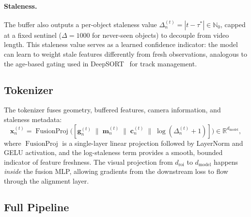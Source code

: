 \documentclass[runningheads]{llncs}
\newcommand{\mR}{\mathbb{R}}
\newcommand{\op}[1]{\operatorname{#1}}
\newcommand{\mat}[1]{\bm{#1}}
\begin{document}
\paragraph{Staleness.}  The buffer also outputs a per-object staleness value $\Delta_n^{(t)} = |t - \tau^*| \in \mathbb{N}_0$, capped at a fixed sentinel ($\Delta=1000$ for never-seen objects) to decouple from video length.  This staleness value serves as a learned confidence indicator: the model can learn to weight stale features differently from fresh observations, analogous to the age-based gating used in DeepSORT~\cite{wojke2017simple} for track management.


\subsection{Tokenizer}

The tokenizer fuses geometry, buffered features, camera information, and staleness metadata:
\begin{equation}
    \mat{x}_n^{(t)} = \op{FusionProj}\bigl([\mat{g}_n^{(t)} \;\|\; \mat{m}_n^{(t)} \;\|\; \mat{c}_n^{(t)} \;\|\; \log(\Delta_n^{(t)} + 1)]\bigr) \in \mR^{d_{\text{model}}},
    \label{eq:pwg_tokenizer}
\end{equation}
where $\op{FusionProj}$ is a single-layer linear projection followed by LayerNorm and GELU activation, and the log-staleness term provides a smooth, bounded indicator of feature freshness.  The visual projection from $d_{\text{roi}}$ to $d_{\text{model}}$ happens \emph{inside} the fusion MLP, allowing gradients from the downstream loss to flow through the alignment layer.

\subsection{Full Pipeline}
\end{document}
